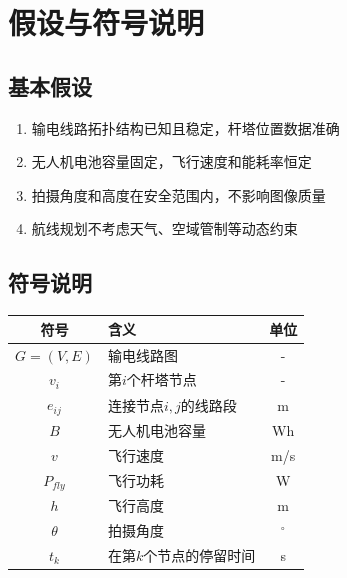 \newpage
\section{假设与符号说明}

\subsection{基本假设}
\begin{enumerate}
    \item 输电线路拓扑结构已知且稳定，杆塔位置数据准确
    \item 无人机电池容量固定，飞行速度和能耗率恒定
    \item 拍摄角度和高度在安全范围内，不影响图像质量
    \item 航线规划不考虑天气、空域管制等动态约束
\end{enumerate}

\subsection{符号说明}
\begin{center}
\begin{tabular}{c l c}
\hline
符号 & 含义 & 单位 \\
\hline
$G=(V,E)$ & 输电线路图 & - \\
$v_i$ & 第$i$个杆塔节点 & - \\
$e_{ij}$ & 连接节点$i,j$的线路段 & m \\
$B$ & 无人机电池容量 & Wh \\
$v$ & 飞行速度 & m/s \\
$P_{fly}$ & 飞行功耗 & W \\
$h$ & 飞行高度 & m \\
$\theta$ & 拍摄角度 & $^\circ$ \\
$t_k$ & 在第$k$个节点的停留时间 & s \\
\hline
\end{tabular}
\end{center}

